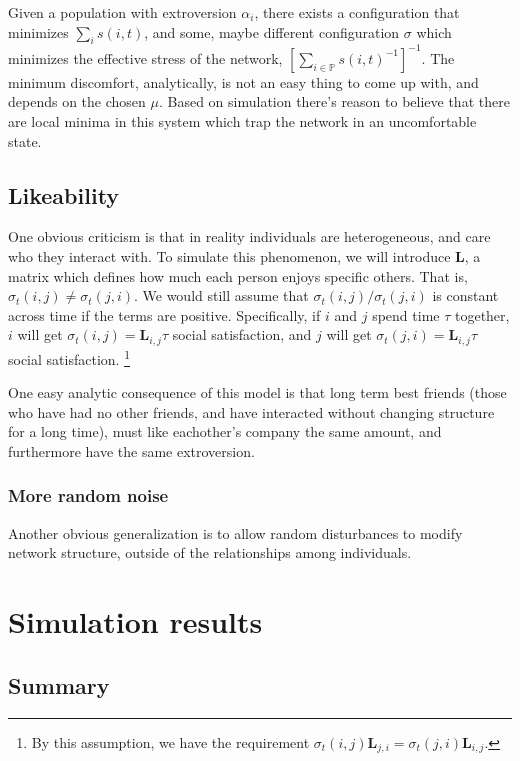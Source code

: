 \documentclass[]{article}
\begin{document}
	Given a population with extroversion ${\alpha_i}$, there exists a configuration that minimizes $\sum_i s(i,t)$, and some, maybe different configuration $\sigma$ which minimizes the effective stress of the network, $[\sum_{i\in\mathbb{P}} s(i,t)^{-1}]^{-1}$. The minimum discomfort, analytically, is not an easy thing to come up with, and depends on the chosen $\mu$. Based on simulation there's reason to believe that there are local minima in this system which trap the network in an uncomfortable state.
	

	\subsection{Likeability}
	One obvious criticism is that in reality individuals are heterogeneous, and care who they interact with.
	To simulate this phenomenon, we will introduce $\boldsymbol{L}$, a matrix which defines how much each person enjoys specific others.
	That is, $\sigma_t(i,j) \neq \sigma_t(j,i)$.
	We would still assume that $\sigma_t(i,j) / \sigma_t(j,i)$ is constant across time if the terms are positive.
	Specifically, if $i$ and $j$ spend time $\tau$ together, $i$ will get $\sigma_t(i,j) = \boldsymbol{L}_{i,j} \tau$ social satisfaction, and $j$ will get $\sigma_t(j,i) = \boldsymbol{L}_{i,j} \tau$ social satisfaction. \footnote{By this assumption, we have the requirement $\sigma_t(i,j)\boldsymbol{L}_{j,i} = \sigma_t(j,i)\boldsymbol{L}_{i,j}$.}
	
	One easy analytic consequence of this model is that long term best friends (those who have had no other friends, and have interacted without changing structure for a long time), must like eachother's company the same amount, and furthermore have the same extroversion.
	
	\subsubsection{More random noise}
	Another obvious generalization is to allow random disturbances to modify network structure, outside of the relationships among individuals.
	
	\section{Simulation results}
	
	\subsection{Summary}
	
\end{document}
